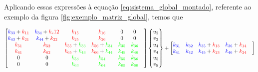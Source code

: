 Aplicando essas expressões à equação \ref{eq:sistema_global_montado}, referente ao exemplo da figura \ref{fig:exemplo_matriz_global}, temos que
\begin{landscape}
    \begin{align*}
        \begin{bmatrix}
            \textcolor{blue}{k_{33}} + \textcolor{red}{k_{11}} &  \textcolor{blue}{k_{34}} + \textcolor{red}{k_s{12}} &  \textcolor{red}{k_{15}} &  \textcolor{red}{k_{16}} & 0 & 0 & \\ 
            \textcolor{blue}{k_{43}} + \textcolor{red}{k_{21}} &  \textcolor{blue}{k_{44}} + \textcolor{red}{k_{22}} &  \textcolor{red}{k_{25}} &  \textcolor{red}{k_{26}} & 0 & 0 & \\ 
            \textcolor{red}{k_{51}} &  \textcolor{red}{k_{52}} &  \textcolor{red}{k_{55}} + \textcolor{green}{k_{33}} &  \textcolor{red}{k_{56}} + \textcolor{green}{k_{34}} &  \textcolor{green}{k_{35}} &  \textcolor{green}{k_{36}} & \\ 
            \textcolor{red}{k_{61}} &  \textcolor{red}{k_{62}} &  \textcolor{red}{k_{65}} + \textcolor{green}{k_{43}} &  \textcolor{red}{k_{66}} + \textcolor{green}{k_{44}} &  \textcolor{green}{k_{45}} &  \textcolor{green}{k_{46}} & \\ 
        0 & 0 &  \textcolor{green}{k_{53}} &  \textcolor{green}{k_{54}} &  \textcolor{green}{k_{55}} &  \textcolor{green}{k_{56}} & \\ 
        0 & 0 &  \textcolor{green}{k_{63}} &  \textcolor{green}{k_{64}} &  \textcolor{green}{k_{65}} &  \textcolor{green}{k_{66}} & \\ 
        \end{bmatrix}
        \begin{Bmatrix}
            u_2 \\ v_2 \\ u_4 \\ v_4 \\ u_5 \\ v_5
        \end{Bmatrix} +
        \begin{bmatrix}
            \textcolor{blue}{k_{31}} &  \textcolor{blue}{k_{32}} &  \textcolor{blue}{k_{35}} + \textcolor{red}{k_{13}} &  \textcolor{blue}{k_{36}} + \textcolor{red}{k_{14}} & \\ 
            \textcolor{blue}{k_{41}} &  \textcolor{blue}{k_{42}} &  \textcolor{blue}{k_{45}} + \textcolor{red}{k_{23}} &  \textcolor{blue}{k_{46}} + \textcolor{red}{k_{24}} & \\ 

\end{bmatrix}
\end{align*}
\end{landscape}
